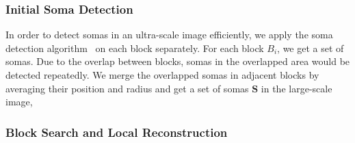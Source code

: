 \subsubsection{Initial Soma Detection}
\label{sec:soma}

In order to detect somas in an ultra-scale image efficiently, we apply the soma detection algorithm~\cite{Quan2013} on each block separately. 
%
For each block $B_{i}$, we get a set of somas.
Due to the overlap between blocks, somas in the overlapped area would be detected repeatedly.
We merge the overlapped somas in adjacent blocks by averaging their position and radius and get a set of somas $\mathbf{S} $ in the large-scale image, 


\subsubsection{Block Search and Local Reconstruction}
\label{sec:trace}

